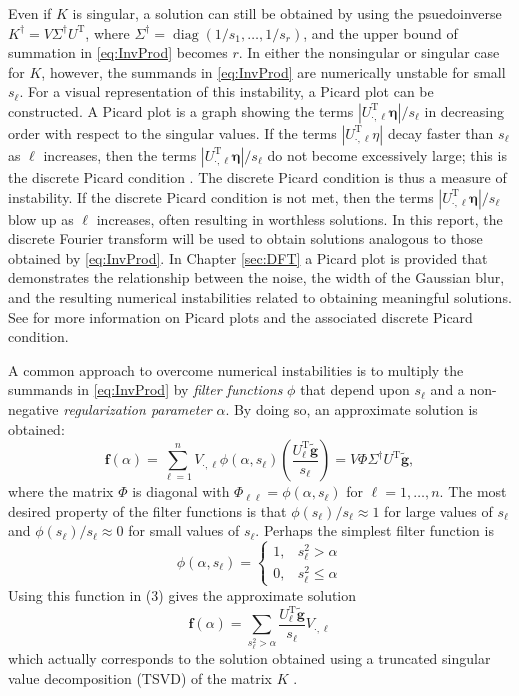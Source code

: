 \documentclass[12pt]{book}
\newcommand{\gnoiseVec}{\widetilde{\mathbf{g}}}	%
\newcommand{\kMat}{K}	%
\newcommand{\fVec}{\mathbf{f}}	%
\newcommand{\trans}{\mathrm{T}}	%
\DeclareMathOperator{\diag}{diag}	%
\newcommand{\regparam}{\alpha}
\newcommand{\filt}{\phi}
\newcommand{\noise}{\eta}	%
\newcommand{\noiseVec}{\bm{\noise}}	%
\newcommand{\singular}{s}	%
\begin{document}
Even if $\kMat$ is singular, a solution can still be obtained by using the psuedoinverse $\kMat^\dagger = V{\Sigma^\dagger}U^\trans$, where $\Sigma^\dagger = \diag(1/\singular_1,\ldots,1/\singular_r)$, and the upper bound of summation in \eqref{eq:InvProd} becomes $r$. In either the nonsingular or singular case for $\kMat$, however, the summands in \eqref{eq:InvProd} are numerically unstable for small $\singular_\ell$. For a visual representation of this instability, a Picard plot can be constructed. A Picard plot is a graph showing the terms $|U^\trans_{\cdot,\ell}\noiseVec|/\singular_\ell$ in decreasing order with respect to the singular values. If the terms $|U^\trans_{\cdot,\ell}\noise|$ decay faster than $\singular_\ell$ as $\ell$ increases, then the terms $|U^\trans_{\cdot,\ell}\noiseVec|/\singular_\ell$ do not become excessively large; this is the discrete Picard condition \cite{ABT}. The discrete Picard condition is thus a measure of instability. If the discrete Picard condition is not met, then the terms $|U^\trans_{\cdot,\ell}\noiseVec|/\singular_\ell$ blow up as $\ell$ increases, often resulting in worthless solutions. In this report, the discrete Fourier transform will be used to obtain solutions analogous to those obtained by \eqref{eq:InvProd}. In Chapter \ref{sec:DFT} a Picard plot is provided that demonstrates the relationship between the noise, the width of the Gaussian blur, and the resulting numerical instabilities related to obtaining meaningful solutions. See \cite{Hansen1990} for more information on Picard plots and the associated discrete Picard condition. \par 
A common approach to overcome numerical instabilities is to multiply the summands in \eqref{eq:InvProd} by \textit{filter functions} $\filt$ that depend upon $\singular_\ell$ and a non-negative \textit{regularization parameter} $\regparam$. By doing so, an approximate solution is obtained:
\begin{equation}
\fVec(\regparam) = \sum_{\ell = 1}^n V_{\cdot,\ell}\filt(\regparam,\singular_\ell)\left(\frac{{U^\trans_\ell}\gnoiseVec}{\singular_\ell}\right) = V\Phi\Sigma^\dagger U^\trans\gnoiseVec,
\label{eq:ApproxSol}
\end{equation}
where the matrix $\Phi$ is diagonal with $\Phi_{\ell\ell} = \filt(\regparam,\singular_\ell)$ for $\ell = 1,\ldots,n$. The most desired property of the filter functions is that $\filt(\singular_\ell)/\singular_\ell \approx 1$  for large values of $\singular_\ell$ and $\filt(\singular_\ell)/\singular_\ell \approx 0$ for small values of $\singular_\ell$.  Perhaps the simplest filter function is
\[\filt(\regparam,\singular_\ell) = \begin{cases}
1, & \singular_\ell^2 > \regparam \\
0, & \singular_\ell^2 \leq \regparam
\end{cases}\]
Using this function in (3) gives the approximate solution
\[\fVec(\regparam) = \sum_{\singular_\ell^2 > \regparam} \frac{{U^\trans_\ell}\gnoiseVec}{\singular_\ell}V_{\cdot,\ell}\]
which actually corresponds to the solution obtained using a truncated singular value decomposition (TSVD) of the matrix $\kMat$ \cite{Vogel:2002}. \par
\end{document}
